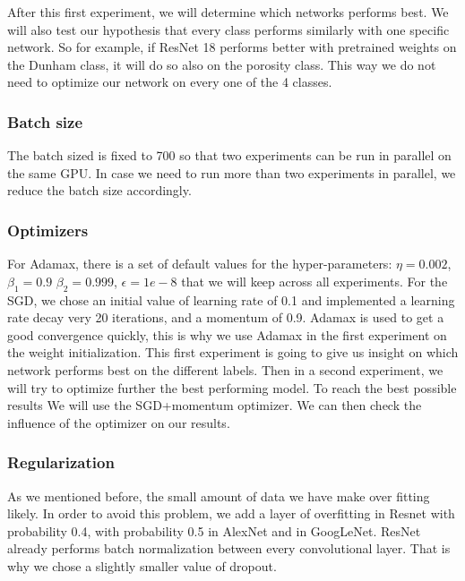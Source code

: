 After this first experiment, we will determine which networks performs best. We will also test our hypothesis that every class performs similarly with one specific network. So for example, if ResNet 18 performs better with pretrained weights on the Dunham class, it will do so also on the porosity class. This way we do not need to optimize our network on every one of the 4 classes. 

\subsubsection{Batch size}
The batch sized is fixed to 700 so that two experiments can be run in parallel on the same GPU. In case we need to run more than two experiments in parallel, we reduce the batch size accordingly.

\subsubsection{Optimizers}
For Adamax, there is a set of default values for the hyper-parameters: \(\eta = 0.002\), \(\beta_1 = 0.9\) \(\beta_2 = 0.999\), \(\epsilon = 1e-8\) that we will keep across all experiments.
For the SGD, we chose an initial value of learning rate of 0.1 and implemented a learning rate decay very 20 iterations, and a momentum of 0.9. 
Adamax is used to get a good convergence quickly, this is why we use Adamax in the first experiment on the weight initialization. This first experiment is going to give us insight on which network performs best on the different labels. Then in a second experiment, we will try to optimize further the best performing model. To reach the best possible results We will use the SGD+momentum optimizer.  We can then check the influence of the optimizer on our results. 

\subsubsection{Regularization}
As we mentioned before, the small amount of data we have make over fitting likely. In order to avoid this problem, we add a layer of overfitting in Resnet with probability 0.4, with probability 0.5 in AlexNet and in GoogLeNet. ResNet already performs batch normalization between every convolutional layer. That is why we chose a slightly smaller value of dropout. 